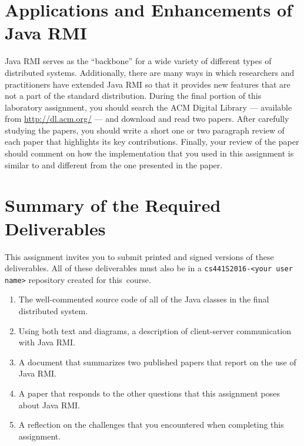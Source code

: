 \section*{Applications and Enhancements of Java RMI}

Java RMI serves as the ``backbone'' for a wide variety of different types of distributed systems. Additionally, there
are many ways in which researchers and practitioners have extended Java RMI so that it provides new features that are
not a part of the standard distribution. During the final portion of this laboratory assignment, you should search the
ACM Digital Library --- available from \url{http://dl.acm.org/} --- and download and read two papers. After carefully
studying the papers, you should write a short one or two paragraph review of each paper that highlights its key
contributions. Finally, your review of the paper should comment on how the implementation that you used in this
assignment is similar to and different from the one presented in the paper.

\section*{Summary of the Required Deliverables}

This assignment invites you to submit printed and signed versions of these deliverables. All of these deliverables must
also be in a {\tt cs441S2016-<your user name>} repository created for \mbox{this course}.

\vspace*{-.1in}

\begin{enumerate}
  \itemsep 0em

  \item The well-commented source code of all of the Java classes in the final distributed system.

  \item Using both text and diagrams, a description of client-server communication with Java RMI.

  \item A document that summarizes two published papers that report on the use of Java RMI.

  \item A paper that responds to the other questions that this assignment poses about Java RMI.

  \item A reflection on the challenges that you encountered when completing this assignment.

\end{enumerate}

